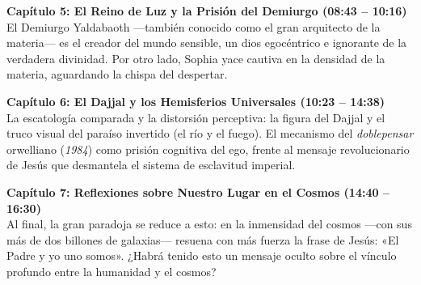\documentclass[10pt]{article}
\newenvironment{extraer}[1]{}{}
\begin{document}
	\begin{minipage}[t]{0.492\textwidth}
		\begin{tcolorbox}[contentStyle, width=\textwidth, equal height group=pagina2]
			\fontsize{7.2pt}{8.5pt}\selectfont\color{textgray}
			
			{\small\color{deepblue}\bfseries\begin{extraer}{cap5_title}Capítulo 5: El Reino de Luz y la Prisión del Demiurgo {\footnotesize\color{golddark}(08:43 -- 10:16)}\end{extraer}}\\[0.04cm]
			\justifying
			\begin{extraer}{cap5_desc}
				El Demiurgo Yaldabaoth —también conocido como el gran arquitecto de la materia— es el creador del mundo sensible, un dios egocéntrico e ignorante de la verdadera divinidad. Por otro lado, Sophia yace cautiva en la densidad de la materia, aguardando la chispa del despertar.
			\end{extraer}
			
			\vspace{0.12cm}
			
			{\small\color{deepblue}\bfseries\begin{extraer}{cap6_title}Capítulo 6: El Dajjal y los Hemisferios Universales {\footnotesize\color{golddark}(10:23 -- 14:38)}\end{extraer}}\\[0.04cm]
			\justifying
			\begin{extraer}{cap6_desc}
				La escatología comparada y la distorsión perceptiva: la figura del Dajjal y el truco visual del paraíso invertido (el río y el fuego). El mecanismo del \textit{doblepensar} orwelliano (\textit{1984}) como prisión cognitiva del ego, frente al mensaje revolucionario de Jesús que desmantela el sistema de esclavitud imperial.
			\end{extraer}
			
			\vspace{0.12cm}
			
			{\small\color{deepblue}\bfseries\begin{extraer}{cap7_title}Capítulo 7: Reflexiones sobre Nuestro Lugar en el Cosmos {\footnotesize\color{golddark}(14:40 -- 16:30)}\end{extraer}}\\[0.04cm]
			\justifying
			\begin{extraer}{cap7_desc}
				Al final, la gran paradoja se reduce a esto: en la inmensidad del cosmos —con sus más de dos billones de galaxias— resuena con más fuerza la frase de Jesús: «El Padre y yo uno somos». ¿Habrá tenido esto un mensaje oculto sobre el vínculo profundo entre la humanidad y el cosmos?
			\end{extraer}
			

\end{tcolorbox}
\end{minipage}
\end{document}

